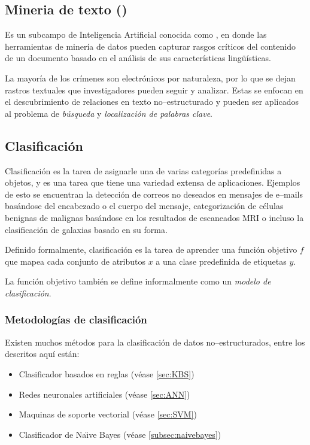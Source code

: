 \subsection{Mineria de texto ()} \label{subsec:NLP}
Es un subcampo de Inteligencia Artificial conocida como , en donde las herramientas de minería de datos pueden capturar rasgos críticos del contenido de un documento basado en el análisis de sus características lingüísticas.

La mayoría de los crímenes son electrónicos por naturaleza, por lo que se dejan rastros textuales que investigadores pueden seguir y analizar. Estas se enfocan en el descubrimiento de relaciones en texto no--estructurado y pueden ser aplicados al problema de \emph{búsqueda} y \emph{localización de palabras clave}.

\subsection{Clasificación} \label{subsec:clasification}
Clasificación es la tarea de asignarle una de varias categorías predefinidas a objetos, y es una tarea que tiene una variedad extensa de aplicaciones. Ejemplos de esto se encuentran la detección de correos no deseados en mensajes de e--mails basándose del encabezado o el cuerpo del mensaje, categorización de células benignas de malignas basándose en los resultados de escaneados MRI o incluso la clasificación de galaxias basado en su forma.

Definido formalmente, clasificación es la tarea de aprender una función objetivo $f$ que mapea cada conjunto de atributos $x$ a una clase predefinida de etiquetas $y$.

La función objetivo también se define informalmente como un \emph{modelo de clasificación}.

\subsubsection{Metodologías de clasificación} \label{subsubsec:classmethods}
Existen muchos métodos para la clasificación de datos no--estructurados, entre los descritos aquí están:
\begin{itemize}
\item Clasificador basados en reglas (véase \ref{sec:KBS})
\item Redes neuronales artificiales (véase \ref{sec:ANN})
\item Maquinas de soporte vectorial (véase \ref{sec:SVM})
\item Clasificador de Na\"{\i}ve Bayes (véase \ref{subsec:naivebayes})
\end{itemize}

